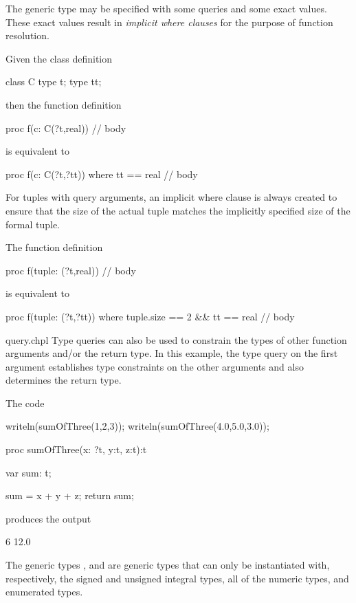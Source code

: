 The generic type may be specified with some queries and some exact
values.  These exact values result in \emph{implicit where clauses}
for the purpose of function resolution.
\begin{example}
Given the class definition
\begin{chapel}
class C {
  type t;
  type tt;
}
\end{chapel}
then the function definition
\begin{chapel}
proc f(c: C(?t,real)) {
  // body
}
\end{chapel}
is equivalent to
\begin{chapel}
proc f(c: C(?t,?tt)) where tt == real {
  // body
}
\end{chapel}
\end{example}
For tuples with query arguments, an implicit where clause is always
created to ensure that the size of the actual tuple matches the
implicitly specified size of the formal tuple.
\begin{example}
The function definition
\begin{chapel}
proc f(tuple: (?t,real)) {
  // body
}
\end{chapel}
is equivalent to
\begin{chapel}
proc f(tuple: (?t,?tt)) where tuple.size == 2 && tt == real {
  // body
}
\end{chapel}
\end{example}

\begin{chapelexample}{query.chpl}
Type queries can also be used to constrain the types of other function arguments
and/or the return type.  In this example, the type query on the first argument
establishes type constraints on the other arguments and also determines the
return type.

The code
\begin{chapel}
writeln(sumOfThree(1,2,3));
writeln(sumOfThree(4.0,5.0,3.0));

proc sumOfThree(x: ?t, y:t, z:t):t {
   var sum: t;
   
   sum = x + y + z;
   return sum;
}
\end{chapel}
produces the output
\begin{chapelprintoutput}{}
6
12.0
\end{chapelprintoutput}
\end{chapelexample}

The generic types ,  and 
are generic types that can only be instantiated with, respectively, the
signed and unsigned integral types, all of the numeric types, and
enumerated types.

